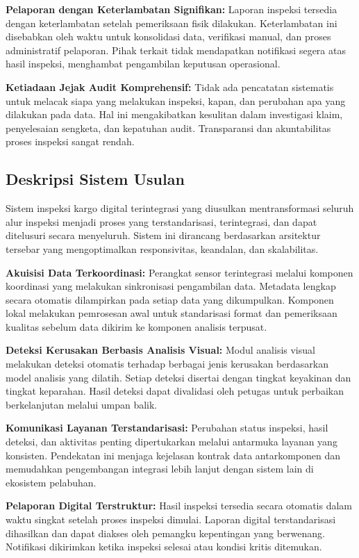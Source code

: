 \textbf{Pelaporan dengan Keterlambatan Signifikan:}
Laporan inspeksi tersedia dengan keterlambatan setelah pemeriksaan fisik dilakukan. Keterlambatan ini disebabkan oleh waktu untuk konsolidasi data, verifikasi manual, dan proses administratif pelaporan. Pihak terkait tidak mendapatkan notifikasi segera atas hasil inspeksi, menghambat pengambilan keputusan operasional.

\textbf{Ketiadaan Jejak Audit Komprehensif:}
Tidak ada pencatatan sistematis untuk melacak siapa yang melakukan inspeksi, kapan, dan perubahan apa yang dilakukan pada data. Hal ini mengakibatkan kesulitan dalam investigasi klaim, penyelesaian sengketa, dan kepatuhan audit. Transparansi dan akuntabilitas proses inspeksi sangat rendah.

\subsection{Deskripsi Sistem Usulan}
\label{subsec:deskripsi-sistem-usulan}

Sistem inspeksi kargo digital terintegrasi yang diusulkan mentransformasi seluruh alur inspeksi menjadi proses yang terstandarisasi, terintegrasi, dan dapat ditelusuri secara menyeluruh. Sistem ini dirancang berdasarkan arsitektur tersebar yang mengoptimalkan responsivitas, keandalan, dan skalabilitas.

\textbf{Akuisisi Data Terkoordinasi:}
Perangkat sensor terintegrasi melalui komponen koordinasi yang melakukan sinkronisasi pengambilan data. Metadata lengkap secara otomatis dilampirkan pada setiap data yang dikumpulkan. Komponen lokal melakukan pemrosesan awal untuk standarisasi format dan pemeriksaan kualitas sebelum data dikirim ke komponen analisis terpusat.

\textbf{Deteksi Kerusakan Berbasis Analisis Visual:}
Modul analisis visual melakukan deteksi otomatis terhadap berbagai jenis kerusakan berdasarkan model analisis yang dilatih. Setiap deteksi disertai dengan tingkat keyakinan dan tingkat keparahan. Hasil deteksi dapat divalidasi oleh petugas untuk perbaikan berkelanjutan melalui umpan balik.

\textbf{Komunikasi Layanan Terstandarisasi:}
Perubahan status inspeksi, hasil deteksi, dan aktivitas penting dipertukarkan melalui antarmuka layanan yang konsisten. Pendekatan ini menjaga kejelasan kontrak data antarkomponen dan memudahkan pengembangan integrasi lebih lanjut dengan sistem lain di ekosistem pelabuhan.

\textbf{Pelaporan Digital Terstruktur:}
Hasil inspeksi tersedia secara otomatis dalam waktu singkat setelah proses inspeksi dimulai. Laporan digital terstandarisasi dihasilkan dan dapat diakses oleh pemangku kepentingan yang berwenang. Notifikasi dikirimkan ketika inspeksi selesai atau kondisi kritis ditemukan.

